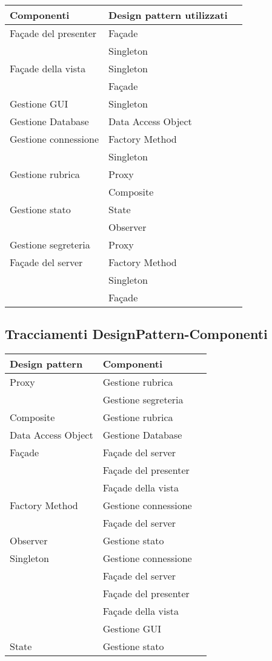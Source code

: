 \begin{center}
\begin{longtable}{lp{}l}
\toprule Componenti & Design pattern utilizzati\\
\midrule
Façade del presenter & Façade \\
 & Singleton \\
Façade della vista & Singleton \\
 & Façade \\
Gestione GUI & Singleton \\
Gestione Database & Data Access Object \\
Gestione connessione & Factory Method \\
 & Singleton \\
Gestione rubrica & Proxy \\
 & Composite \\
Gestione stato & State \\
 & Observer \\
Gestione segreteria & Proxy \\
Façade del server & Factory Method \\
 & Singleton \\
 & Façade \\
\bottomrule
\end{longtable}
\end{center}
\subsection{Tracciamenti DesignPattern-Componenti}\label{sec:tracDpComp}

\begin{center}
\begin{longtable}{lp{}l}
\toprule Design pattern & Componenti\\
\midrule
Proxy & Gestione rubrica \\
 & Gestione segreteria \\
Composite & Gestione rubrica \\
Data Access Object & Gestione Database \\
Façade & Façade del server \\
 & Façade del presenter \\
 & Façade della vista \\
Factory Method & Gestione connessione \\
 & Façade del server \\
Observer & Gestione stato \\
Singleton & Gestione connessione \\
 & Façade del server \\
 & Façade del presenter \\
 & Façade della vista \\
 & Gestione GUI \\
State & Gestione stato \\
\bottomrule
\end{longtable}
\end{center}
